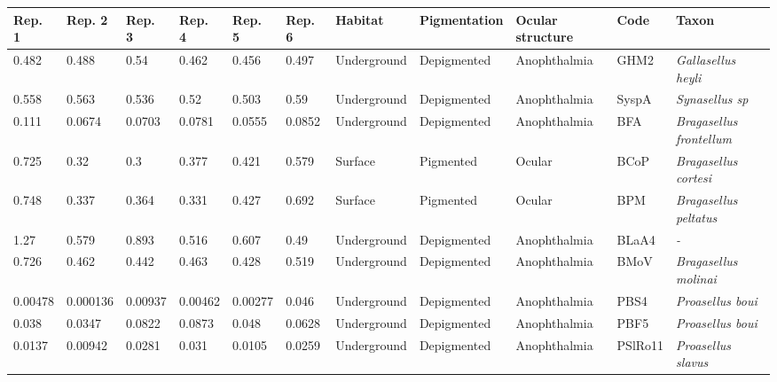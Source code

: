 \begin{tabular}{lllllllllll}
\toprule
        Rep. 1 &              Rep. 2 &         Rep. 3 &         Rep. 4 &         Rep. 5 &         Rep. 6 &      Habitat & Pigmentation & Ocular structure &     Code &                                    Taxon \\
\midrule
         0.482 &               0.488 &           0.54 &          0.462 &          0.456 &          0.497 &  Underground &  Depigmented &     Anophthalmia &     GHM2 &               \textit{Gallasellus heyli} \\
         0.558 &               0.563 &          0.536 &           0.52 &          0.503 &           0.59 &  Underground &  Depigmented &     Anophthalmia &    SyspA &                   \textit{Synasellus sp} \\
         0.111 &              0.0674 &         0.0703 &         0.0781 &         0.0555 &         0.0852 &  Underground &  Depigmented &     Anophthalmia &      BFA &          \textit{Bragasellus frontellum} \\
         0.725 &                0.32 &            0.3 &          0.377 &          0.421 &          0.579 &      Surface &    Pigmented &           Ocular &     BCoP &             \textit{Bragasellus cortesi} \\
         0.748 &               0.337 &          0.364 &          0.331 &          0.427 &          0.692 &      Surface &    Pigmented &           Ocular &      BPM &            \textit{Bragasellus peltatus} \\
          1.27 &               0.579 &          0.893 &          0.516 &          0.607 &           0.49 &  Underground &  Depigmented &     Anophthalmia &    BLaA4 &                               \textit{-} \\
         0.726 &               0.462 &          0.442 &          0.463 &          0.428 &          0.519 &  Underground &  Depigmented &     Anophthalmia &     BMoV &             \textit{Bragasellus molinai} \\
       0.00478 &            0.000136 &        0.00937 &        0.00462 &        0.00277 &          0.046 &  Underground &  Depigmented &     Anophthalmia &     PBS4 &                 \textit{Proasellus boui} \\
         0.038 &              0.0347 &         0.0822 &         0.0873 &          0.048 &         0.0628 &  Underground &  Depigmented &     Anophthalmia &     PBF5 &                 \textit{Proasellus boui} \\
        0.0137 &             0.00942 &         0.0281 &          0.031 &         0.0105 &         0.0259 &  Underground &  Depigmented &     Anophthalmia &  PSlRo11 &               \textit{Proasellus slavus} \\

\end{tabular}
